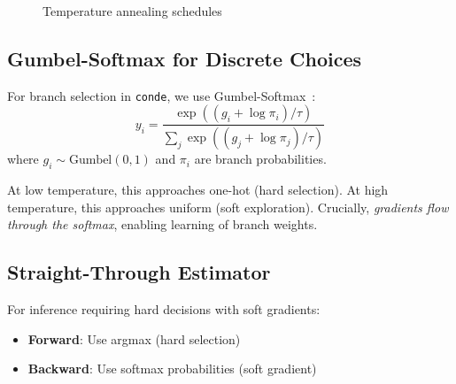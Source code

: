 \documentclass[11pt,a4paper]{article}
\begin{document}
\begin{figure}[ht]
\centering
{}
\caption{Temperature annealing schedules}
\label{fig:annealing_chirho}
\end{figure}

\subsection{Gumbel-Softmax for Discrete Choices}
\label{subsec:gumbel_chirho}

For branch selection in \texttt{conde}, we use Gumbel-Softmax~\cite{gumbel_softmax_chirho}:
\[
y_i = \frac{\exp((g_i + \log \pi_i) / \tau)}{\sum_j \exp((g_j + \log \pi_j) / \tau)}
\]
where $g_i \sim \text{Gumbel}(0, 1)$ and $\pi_i$ are branch probabilities.

At low temperature, this approaches one-hot (hard selection).
At high temperature, this approaches uniform (soft exploration).
Crucially, \emph{gradients flow through the softmax}, enabling learning of branch weights.

\subsection{Straight-Through Estimator}
\label{subsec:ste_chirho}

For inference requiring hard decisions with soft gradients:
\begin{itemize}
  \item \textbf{Forward}: Use argmax (hard selection)
  \item \textbf{Backward}: Use softmax probabilities (soft gradient)
\end{itemize}
\end{document}
